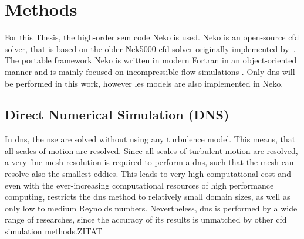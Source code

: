 \chapter{Methods}\label{chap: Methods}

For this Thesis, the high-order \acrfull{sem} code Neko is used.
Neko is an open-source \acrfull{cfd} solver, that is based on the older Nek5000 \acrshort{cfd} solver originally implemented by~\cite{fischerNek500WebPage}.
The portable framework Neko is written in modern Fortran in an object-oriented manner and is mainly focused on incompressible flow simulations \citep{janssonNekoModernPortable2024}.
Only \acrfull{dns} will be performed in this work, however \acrfull{les} models are also implemented in Neko.

\section{Direct Numerical Simulation (DNS)}
In \acrshort{dns}, the \acrlong{nse} are solved without using any turbulence model.
This means, that all scales of motion are resolved.
Since all scales of turbulent motion are resolved, a very fine mesh resolution is required to perform a \acrshort{dns}, such that the mesh can resolve also the smallest eddies.
This leads to very high computational cost and even with the ever-increasing computational resources of high performance computing, restricts the \acrshort{dns} method to relatively small domain sizes, as well as only low to medium Reynolds numbers.
Nevertheless, \acrshort{dns} is performed by a wide range of researches, since the accuracy of its results is unmatched by other \acrshort{cfd} simulation methods.ZITAT\\

